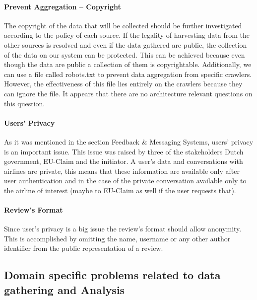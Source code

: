 \documentclass{article}
\begin{document}
\paragraph{Prevent Aggregation – Copyright} The copyright of the data that will be collected should be further investigated according to the policy of each source. If the legality of 
harvesting data from the other sources is resolved and even if the data gathered are public, the collection of the data on our system can be protected. This can be achieved because 
even though the data are public a collection of them is copyrightable. Additionally, we can use a file called robots.txt to prevent data aggregation from specific crawlers. However, 
the effectiveness of this file lies entirely on the crawlers because they can ignore the file. It appears that there are no architecture relevant questions on this question.

\paragraph{Users' Privacy} As it was mentioned in the section Feedback \& Messaging Systems, users' privacy is an important issue. This issue was raised by three of the stakeholders 
Dutch government, EU-Claim and the initiator. A user's data and conversations with airlines are private, this means that these information are available only after user authentication 
and in the case of the private conversation available only to the airline of interest (maybe to EU-Claim as well if the user requests that). 

\paragraph{Review's Format} Since user's privacy is a big issue the review's format should allow anonymity. This is accomplished by omitting the name, username or any other author 
identifier from the public representation of a review.

\subsection{Domain specific problems related to data gathering and Analysis}
\end{document}
